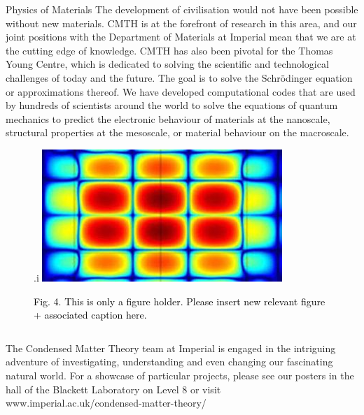 \documentclass[xcolor={table}]{beamer}
\begin{document}
\begin{frame}[fragile=singleslide,t]
\begin{columns}[onlytextwidth,T]
\begin{column}{.47\textwidth}
\begin{block}{Physics of Materials}
The development of civilisation would not have been possible without new materials. CMTH is at the forefront of research in this area, and our joint positions with the Department of Materials at Imperial mean that we are at the cutting edge of knowledge. CMTH has also been pivotal for the Thomas Young Centre, which is dedicated to solving the scientific and technological challenges of today and the future. The goal is to solve the Schr{\"o}dinger equation or approximations thereof. We have developed computational codes that are used by hundreds of scientists around the world to solve the equations of quantum mechanics to predict the electronic behaviour of materials at the nanoscale, structural properties at the mesoscale, or material behaviour on the macroscale.
\end{block}
\vspace*{-1.5cm}
\begin{figure}
\centeringwww.i
    \includegraphics[width=0.9\columnwidth]{simulation_materials.jpg}
    \caption{\footnotesize \textcolor{black}{Fig. 4. This is only a figure holder. Please insert new relevant figure + associated caption here.}}
\end{figure}

\end{column}
\end{columns}

\begin{tcolorbox}[colback=BackgroundBlue,colframe=ICDeepBlue,fontupper=\color{ICDeepBlue}]
The Condensed Matter Theory team at Imperial is engaged in the intriguing adventure of investigating, understanding and even changing our fascinating natural world. For a showcase of particular projects, please see our posters in the hall of the Blackett Laboratory on Level 8 or visit www.imperial.ac.uk/condensed-matter-theory/
\end{tcolorbox}
\end{frame} 
\end{document}
